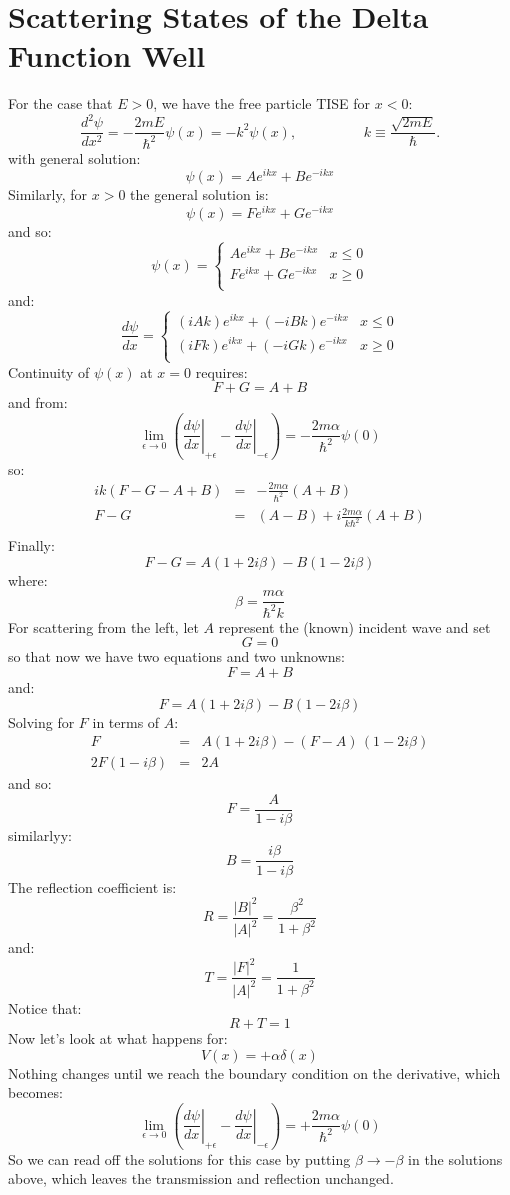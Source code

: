 \documentclass[12pt]{book}
\begin{document}
\section{Scattering States of the Delta Function Well}

For the case that $E>0$, we have the free particle TISE for $x<0$:
\begin{equation*}
\frac{d^2 \psi}{d x^2} = -\frac{2mE}{\hbar^2}\psi(x) = -k^2 \psi(x), \hspace{2cm} k \equiv \frac{\sqrt{2mE}}{\hbar}.
\end{equation*}
with general solution:
$$\psi(x) = A e^{\displaystyle ikx} + B e^{\displaystyle -ikx}$$
Similarly, for $x>0$ the general solution is:
$$\psi(x) = F e^{\displaystyle ikx} + G e^{\displaystyle -ikx}$$
and so:
$$\psi(x) = \begin{cases}
A e^{\displaystyle ikx} + B e^{\displaystyle -ikx} &  x\leq0 \\
F e^{\displaystyle ikx} + G e^{\displaystyle -ikx} &  x\geq0 \\
\end{cases}
$$
and:
$$\frac{d\psi}{dx} = \begin{cases}
(iAk) e^{\displaystyle ikx} + (-iBk) e^{\displaystyle -ikx} &  x\leq0 \\
(iFk) e^{\displaystyle ikx} + (-iGk) e^{\displaystyle -ikx} &  x\geq0 \\
\end{cases}
$$
Continuity of $\psi(x)$ at $x=0$ requires:
$$F+G=A+B$$
and from:
$$
\lim_{\epsilon \to 0} \left( \left. \frac{d\psi}{d x} \right\rvert_{+\epsilon} 
- \left. \frac{d\psi}{d x} \right\rvert_{-\epsilon} \right) = 
-\frac{2m\alpha}{\hbar^2} \psi(0) 
$$
so:
\begin{eqnarray*}
ik(F-G-A+B) &=& -\frac{2m\alpha}{\hbar^2} (A+B) \\
F-G &=& (A-B)+i\frac{2m\alpha}{k\hbar^2} (A+B) \\
\end{eqnarray*}
Finally:
$$F-G = A (1+2i\beta) - B (1-2i\beta) $$
where:
$$\beta = \frac{m \alpha}{\hbar^2 k}$$
For scattering from the left, let $A$ represent the (known) incident wave and set
$$G=0$$ so that now we have two equations and two unknowns:
$$F = A + B$$
and:
$$F = A (1+2i\beta) - B (1-2i\beta) $$
Solving for $F$ in terms of $A$:
\begin{eqnarray*}
F &=& A (1+2i\beta) - (F-A)\,(1-2i\beta)\\
2F(1-i\beta) &=& 2A 
\end{eqnarray*}
and so:
$$F = \frac{A}{1-i\beta}$$
similarlyy:
$$B = \frac{i\beta}{1-i\beta}$$
The reflection coefficient is:
$$R = \frac{|B|^2}{|A|^2} = \frac{\beta^2}{1+\beta^2}$$
and:
$$T = \frac{|F|^2}{|A|^2} = \frac{1}{1+\beta^2}$$
Notice that:
$$R+T=1$$
Now let's look at what happens for:
$$V(x) = +\alpha \delta(x)$$
Nothing changes until we reach the boundary condition on the derivative, which becomes:
$$
\lim_{\epsilon \to 0} \left( \left. \frac{d\psi}{d x} \right\rvert_{+\epsilon} 
- \left. \frac{d\psi}{d x} \right\rvert_{-\epsilon} \right) = 
+\frac{2m\alpha}{\hbar^2} \psi(0) 
$$
So we can read off the solutions for this case by putting $\beta \to -\beta$ in the solutions above, which leaves the transmission and reflection unchanged.
\end{document}
